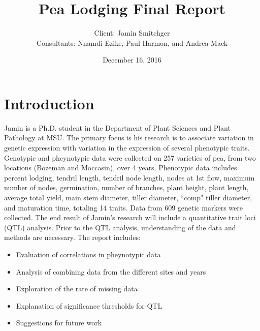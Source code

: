 \documentclass[11pt]{article}\usepackage[]{graphicx}\usepackage[]{color}
\title{Pea Lodging Final Report}
\author{Client: Jamin Smitchger\\
Consultants: Nnamdi Ezike, Paul Harmon, and Andrea Mack}
\date{December 16, 2016}
\begin{document}
\maketitle





\section{Introduction}
Jamin is a Ph.D. student in the Department of Plant Sciences and Plant Pathology at MSU. The primary focus is his research is to associate variation in genetic expression with variation in the expression of several phenotypic traits. Genotypic and pheynotypic data were collected on 257 varieties of pea, from two locations (Bozeman and Moccasin), over 4 years. Phenotypic data includes percent lodging, tendril length, tendril node length, nodes at 1st flow, maximum number of nodes, germination, number of branches, plant height, plant length, average total yield, main stem diameter, tiller diameter, ``comp" tiller diameter, and maturation time, totaling 14 traits. Data from 609 genetic markers were collected. The end result of Jamin's research will include a quantitative trait loci (QTL) analysis. Prior to the QTL analysis, understanding of the data and methods are necessary. The report includes:

\begin{itemize}

\item Evaluation of correlations in pheynotypic data

\item Analysis of combining data from the different sites and years

\item Exploration of the rate of missing data

\item Explanation of significance thresholds for QTL 

\item Suggestions for future work
\end{itemize}
\pagebreak
\end{document}
